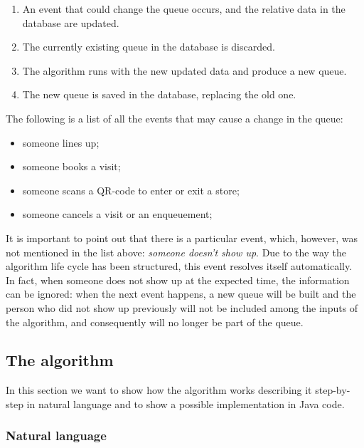 \begin{enumerate}[topsep=0pt]
    \item An event that could change the queue occurs, and the relative data in the database are updated.
    \item The currently existing queue in the database is discarded.
    \item The algorithm runs with the new updated data and produce a new queue.
    \item The new queue is saved in the database, replacing the old one.
\end{enumerate}

\noindent
The following is a list of all the events that may cause a change in the queue:

\begin{itemize}[topsep=0pt]
    \item someone lines up;
    \item someone books a visit;
    \item someone scans a QR-code to enter or exit a store;
    \item someone cancels a visit or an enqueuement;
\end{itemize}

It is important to point out that there is a particular event, which, however, was not mentioned in the list above: \textit{someone doesn't show up}. Due to the way the algorithm life cycle has been structured, this event resolves itself automatically. In fact, when someone does not show up at the expected time, the information can be ignored: when the next event happens, a new queue will be built and the person who did not show up previously will not be included among the inputs of the algorithm, and consequently will no longer be part of the queue.

\subsection{The algorithm}
\label{subsubsect:implementation}

In this section we want to show how the algorithm works describing it step-by-step in natural language and to show a possible implementation in Java code.

\subsubsection{Natural language}
\label{subsubsect:naturallanguage}

